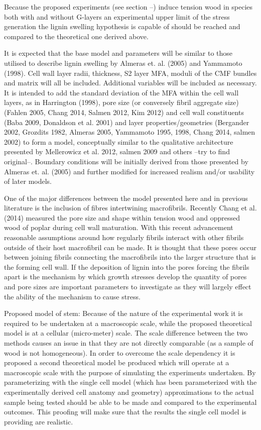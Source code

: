 \documentclass{article}
\begin{document}
Because the proposed experiments (see section --) induce tension wood in species
both with and without G-layers an experimental upper limit of the stress
generation the lignin swelling hypothesis is capable of should be reached and
compared to the theoretical one derived above.

It is expected that the base model and parameters will be similar to those
utilised to describe lignin swelling by Almeras  et. al. (2005) and Yammamoto
(1998). Cell wall layer radii, thickness, S2 layer MFA, moduli of the CMF
bundles and matrix will all be included. Additional variables will be included
as necessary. It is intended to add the standard deviation of the MFA within the
cell wall layers, as in Harrington (1998), pore size (or conversely fibril
aggregate size) (Fahlen 2005, Chang 2014, Salmen 2012, Kim 2012) and cell wall
constituents (Baba 2009, Donaldson et al. 2001) and layer properties/geometries
(Bergander 2002, Grozdits 1982, Almeras 2005, Yammamoto 1995, 1998, Chang 2014,
salmen 2002) to form a model, conceptually similar to the qualitative
architecture presented by Mellerowicz et al. 2012, salmen 2009 and others --try
to find original--. Boundary conditions will be initially derived from those
presented by Almeras et. al. (2005) and further modified for increased realism
and/or usability of later models.

One of the major differences between the model presented here and in previous
literature is the inclusion of fibres intertwining macrofibrils. Recently Chang
et al. (2014) measured the pore size and shape within tension wood and
oppressed wood of poplar during cell wall maturation. With this recent
advancement reasonable assumptions around how regularly fibrils interact with
other fibrils outside of their host macrofibril can be made. It is thought that
these pores occur between joining fibrils connecting the macrofibrils into
the larger structure that is the forming cell wall. If the deposition of lignin
into the pores forcing the fibrils apart is the mechanism by which growth
stresses develop the quantity of pores and pore sizes are important parameters
to investigate as they will largely effect the ability of the mechanism to cause
stress.

Proposed model of stem:
Because of the nature of the experimental work it is required to be undertaken
at a macroscopic scale, while the proposed theoretical model is at a cellular
(micro-meter) scale. The scale difference between the two methods causes an
issue in that they are not directly comparable (as a sample of wood is not
homogeneous). In order to overcome the scale dependency it is proposed a second
theoretical model be produced which will operate at a macroscopic scale with the
purpose of simulating the experiments undertaken. By parameterizing with the
single cell model (which has been parameterized with the experimentally derived
cell anatomy and geometry) approximations to the actual sample being tested
should be able to be made and compared to the experimental outcomes. This
proofing will make sure that the results the single cell model is providing are
realistic.
\end{document}
